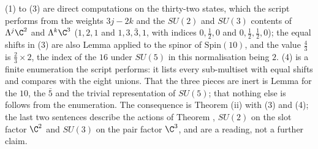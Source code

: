 (1) to (3) are direct computations on the thirty-two states, which the script performs from the weights $3j - 2k$ and the $SU(2)$ and $SU(3)$ contents of $\Lambda^{j}\C^{2}$ and $\Lambda^{k}\C^{3}$ ($1, 2, 1$ and $1, 3, \bar{3}, 1$, with indices $0, \tfrac12, 0$ and $0, \tfrac12, \tfrac12, 0$); the equal shifts in (3) are also Lemma  applied to the spinor of $\mathrm{Spin}(10)$, and the value $\tfrac43$ is $\tfrac23 \times 2$, the index of the $16$ under $SU(5)$ in this normalisation being $2$. (4) is a finite enumeration the script performs: it lists every sub-multiset with equal shifts and compares with the eight unions. That the three pieces are inert is Lemma  for the $10$, the $\bar{5}$ and the trivial representation of $SU(5)$; that nothing else is follows from the enumeration. The consequence is Theorem (ii) with (3) and (4); the last two sentences describe the actions of Theorem , $SU(2)$ on the slot factor $\C^{2}$ and $SU(3)$ on the pair factor $\C^{3}$, and are a reading, not a further claim.
